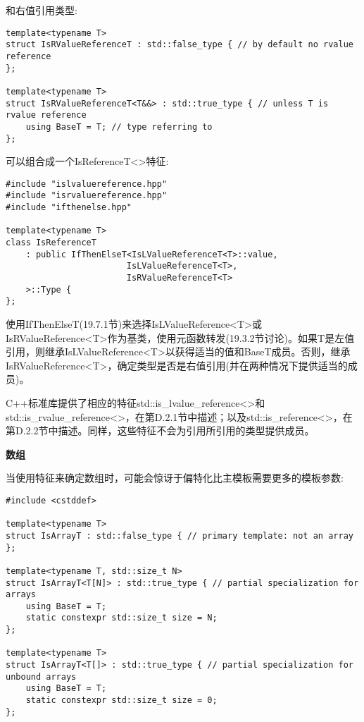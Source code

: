 和右值引用类型:

\begin{lstlisting}[style=styleCXX]
template<typename T>
struct IsRValueReferenceT : std::false_type { // by default no rvalue reference
};

template<typename T>
struct IsRValueReferenceT<T&&> : std::true_type { // unless T is rvalue reference
	using BaseT = T; // type referring to
};
\end{lstlisting}

可以组合成一个IsReferenceT<>特征:

\begin{lstlisting}[style=styleCXX]
#include "islvaluereference.hpp"
#include "isrvaluereference.hpp"
#include "ifthenelse.hpp"

template<typename T>
class IsReferenceT
	: public IfThenElseT<IsLValueReferenceT<T>::value,
						IsLValueReferenceT<T>,
						IsRValueReferenceT<T>
	>::Type {
};
\end{lstlisting}

使用IfThenElseT(19.7.1节)来选择IsLValueReference<T>或IsRValueReference<T>作为基类，使用元函数转发(19.3.2节讨论)。如果T是左值引用，则继承IsLValueReference<T>以获得适当的值和BaseT成员。否则，继承IsRValueReference<T>，确定类型是否是右值引用(并在两种情况下提供适当的成员)。

C++标准库提供了相应的特征std::is\_lvalue\_reference<>和std::is\_rvalue\_reference<>，在第D.2.1节中描述；以及std::is\_reference<>，在第D.2.2节中描述。同样，这些特征不会为引用所引用的类型提供成员。

\noindent
\textbf{数组}

当使用特征来确定数组时，可能会惊讶于偏特化比主模板需要更多的模板参数:

\begin{lstlisting}[style=styleCXX]
#include <cstddef>

template<typename T>
struct IsArrayT : std::false_type { // primary template: not an array
};

template<typename T, std::size_t N>
struct IsArrayT<T[N]> : std::true_type { // partial specialization for arrays
	using BaseT = T;
	static constexpr std::size_t size = N;
};

template<typename T>
struct IsArrayT<T[]> : std::true_type { // partial specialization for unbound arrays
	using BaseT = T;
	static constexpr std::size_t size = 0;
};
\end{lstlisting}

